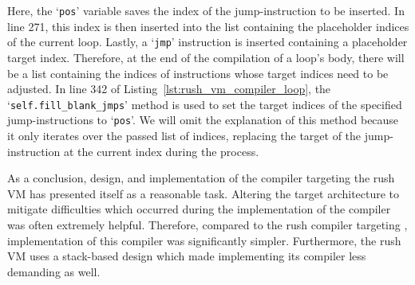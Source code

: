 
Here, the `\texttt{pos}' variable saves the index of the jump-instruction to be inserted.
In line 271, this index is then inserted into the list containing the placeholder indices of the current loop.
Lastly, a `\texttt{jmp}' instruction is inserted containing a placeholder target index.
Therefore, at the end of the compilation of a loop's body, there will be a list containing the indices of instructions whose target indices need to be adjusted.
In line 342 of Listing~\ref{lst:rush_vm_compiler_loop}, the `\texttt{self.fill\_blank\_jmps}' method is used to set the target indices of the specified jump-instructions to `\texttt{pos}'.
We will omit the explanation of this method because it only iterates over the passed list of indices, replacing the target of the jump-instruction at the current index during the process.

As a conclusion, design, and implementation of the compiler targeting the rush VM has presented itself as a reasonable task.
Altering the target architecture to mitigate difficulties which occurred during the implementation of the compiler was often extremely helpful.
Therefore, compared to the rush compiler targeting \riscv{},
implementation of this compiler was significantly simpler.
Furthermore, the rush VM uses a stack-based design which made implementing its compiler less demanding as well.
